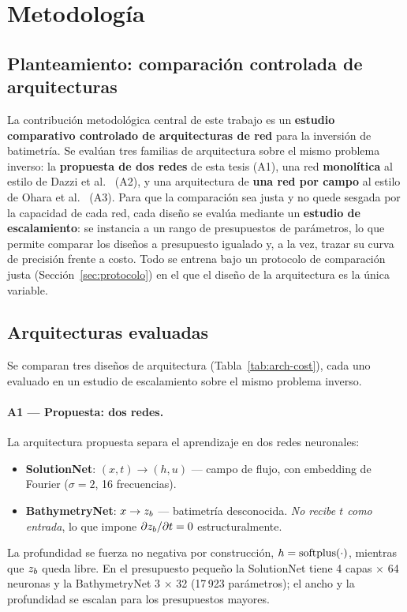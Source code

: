 \section{Metodología}
\label{sec:method}

\subsection{Planteamiento: comparación controlada de arquitecturas}

La contribución metodológica central de este trabajo es un \textbf{estudio
comparativo controlado de arquitecturas de red} para la inversión de
batimetría. Se evalúan tres familias de arquitectura sobre el mismo problema
inverso: la \textbf{propuesta de dos redes} de esta tesis (A1), una red
\textbf{monolítica} al estilo de Dazzi et al.\ \cite{dazzi2024} (A2), y una
arquitectura de \textbf{una red por campo} al estilo de Ohara et al.\
\cite{ohara2024} (A3). Para que la comparación sea justa y no quede sesgada por
la capacidad de cada red, cada diseño se evalúa mediante un \textbf{estudio de
escalamiento}: se instancia a un rango de presupuestos de parámetros, lo que
permite comparar los diseños a presupuesto igualado y, a la vez, trazar su
curva de precisión frente a costo. Todo se entrena bajo un protocolo de
comparación justa (Sección~\ref{sec:protocolo}) en el que el diseño de la
arquitectura es la única variable.

\subsection{Arquitecturas evaluadas}
\label{sec:arquitecturas}

Se comparan tres diseños de arquitectura (Tabla~\ref{tab:arch-cost}), cada uno
evaluado en un estudio de escalamiento sobre el mismo problema inverso.

\paragraph{A1 --- Propuesta: dos redes.}
La arquitectura propuesta separa el aprendizaje en dos redes neuronales:
\begin{itemize}
  \item \textbf{SolutionNet}: $(x, t) \to (h, u)$ --- campo de flujo, con
        embedding de Fourier \cite{tancik2020} ($\sigma = 2$, 16 frecuencias).
  \item \textbf{BathymetryNet}: $x \to z_b$ --- batimetría desconocida.
        \emph{No recibe $t$ como entrada}, lo que impone
        $\partial z_b/\partial t = 0$ estructuralmente.
\end{itemize}
La profundidad se fuerza no negativa por construcción,
$h = \operatorname{softplus}(\cdot)$, mientras que $z_b$ queda libre. En el presupuesto
pequeño la SolutionNet tiene 4 capas $\times$ 64 neuronas y la BathymetryNet
3 $\times$ 32 (17\,923 parámetros); el ancho y la profundidad se escalan para
los presupuestos mayores.

